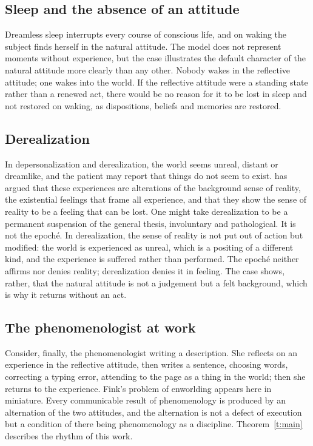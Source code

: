 \documentclass{situationist-preprint}
\begin{document}
\subsection{Sleep and the absence of an attitude}

Dreamless sleep interrupts every course of conscious life, and on waking the subject finds herself in the natural attitude. The model does not represent moments without experience, but the case illustrates the default character of the natural attitude more clearly than any other. Nobody wakes in the reflective attitude; one wakes into the world. If the reflective attitude were a standing state rather than a renewed act, there would be no reason for it to be lost in sleep and not restored on waking, as dispositions, beliefs and memories are restored.

\subsection{Derealization}

In depersonalization and derealization, the world seems unreal, distant or dreamlike, and the patient may report that things do not seem to exist. \citet{Ratcliffe2008} has argued that these experiences are alterations of the background sense of reality, the existential feelings that frame all experience, and that they show the sense of reality to be a feeling that can be lost. One might take derealization to be a permanent suspension of the general thesis, involuntary and pathological. It is not the epoché. In derealization, the sense of reality is not put out of action but modified: the world is experienced as unreal, which is a positing of a different kind, and the experience is suffered rather than performed. The epoché neither affirms nor denies reality; derealization denies it in feeling. The case shows, rather, that the natural attitude is not a judgement but a felt background, which is why it returns without an act.

\subsection{The phenomenologist at work}

Consider, finally, the phenomenologist writing a description. She reflects on an experience in the reflective attitude, then writes a sentence, choosing words, correcting a typing error, attending to the page as a thing in the world; then she returns to the experience. Fink's problem of enworlding appears here in miniature. Every communicable result of phenomenology is produced by an alternation of the two attitudes, and the alternation is not a defect of execution but a condition of there being phenomenology as a discipline. Theorem~\ref{t:main} describes the rhythm of this work.
\end{document}
